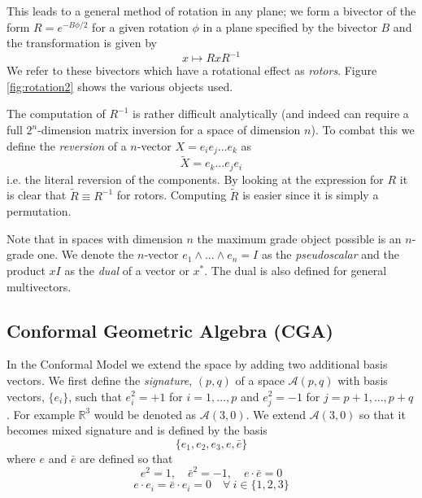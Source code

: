 This leads to a general method of rotation in any plane; we
form a bivector of the form $R = e^{-B\phi/2}$ for a given rotation 
$\phi$ in a plane specified by the bivector $B$ and the transformation
is given by
\begin{displaymath}
x \mapsto RxR^{-1}
\end{displaymath}
We refer to these bivectors which have a rotational effect as \emph{rotors}.
Figure \ref{fig:rotation2} shows the various objects used.

The computation of $R^{-1}$ is rather difficult analytically (and indeed can
require a full $2^n$-dimension matrix inversion for a space of
dimension $n$). To combat this we define
the \emph{reversion} of a $n$-vector $X = e_ie_j...e_k$ as
\[
\tilde{X} = e_k...e_je_i
\]
i.e. the literal reversion of the components. By looking at the expression for
$R$ it is clear that $\tilde{R} \equiv R^{-1}$ for rotors. Computing $\tilde{R}$
is easier since it is simply a permutation.

Note that in spaces with dimension $n$ the maximum grade object 
possible is an $n$-grade
one. We denote the $n$-vector $e_1 \wedge ... \wedge e_n = I$ as the \emph{pseudoscalar}
and the product $xI$ as the \emph{dual} of a vector or $x^*$. The dual is also defined
for general multivectors.


\subsection{Conformal Geometric Algebra (CGA)}

In the Conformal Model \cite{hestenes2} we extend the space by adding two 
additional basis
vectors. We first define the \emph{signature}, $(p,q)$ of a space
$\mathcal{A}(p,q)$ with basis vectors, $\{e_i\}$, such
that $e_i^2 = +1$ for $i = 1, ..., p$ and $e_j^2 = -1$ for $j = p+1, ..., p+q$.
For example $\mathbb{R}^3$ would
be denoted as $\mathcal{A}(3,0)$.
We extend $\mathcal{A}(3,0)$ so that it becomes mixed signature and is defined by the basis
\begin{displaymath}
\{ e_1, e_2, e_3, e, \bar{e} \}
\end{displaymath}
where $e$ and $\bar{e}$ are defined so that
\begin{displaymath}
e^2 = 1,\quad \bar{e}^2 = -1, \quad e\cdot \bar{e} = 0
\end{displaymath}
\begin{displaymath}
e \cdot e_i = \bar{e} \cdot e_i = 0 \quad \forall \  i \in \{ 1,2,3 \}
\end{displaymath}

